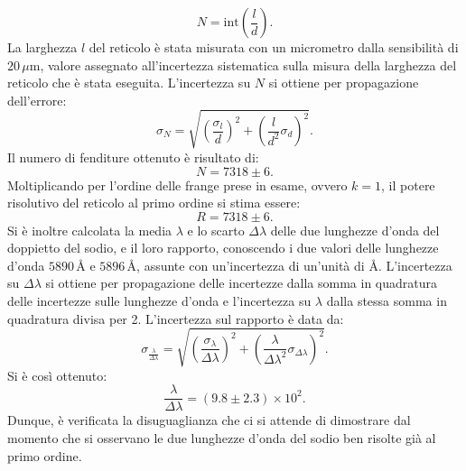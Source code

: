\documentclass[a4paper,12pt]{article}
\begin{document}
\[
N = \text{int}\left(\frac{l}{d}\right).
\]
La larghezza \( l \) del reticolo è stata misurata con un micrometro dalla sensibilità di \( 20 \, \mu\text{m} \), valore assegnato all’incertezza sistematica sulla misura della larghezza del reticolo che è stata eseguita.
L’incertezza su \( N \) si ottiene per propagazione dell’errore:
\[
\sigma_N = \sqrt{\left(\frac{\sigma_l}{d}\right)^2 + \left(\frac{l}{d^2}\sigma_d\right)^2}.
\]
Il numero di fenditure ottenuto è risultato di:
\[
N = 7318 \pm 6.
\]
Moltiplicando per l’ordine delle frange prese in esame, ovvero \( k = 1 \), il potere risolutivo del reticolo al primo ordine si stima essere:
\[
R = 7318 \pm 6.
\]
Si è inoltre calcolata la media \( \lambda \) e lo scarto \( \Delta\lambda \) delle due lunghezze d’onda del doppietto del sodio, e il loro rapporto, conoscendo i due valori delle lunghezze d’onda \( 5890 \, \text{\AA} \) e \( 5896 \, \text{\AA} \), assunte con un’incertezza di un’unità di \(\text{\AA}\).
L’incertezza su \( \Delta\lambda \) si ottiene per propagazione delle incertezze dalla somma in quadratura delle incertezze sulle lunghezze d’onda e l’incertezza su \( \lambda \) dalla stessa somma in quadratura divisa per 2.
L’incertezza sul rapporto è data da:
\[
\sigma_{\frac{\lambda}{\Delta\lambda}} = \sqrt{\left(\frac{\sigma_\lambda}{\Delta\lambda}\right)^2 + \left(\frac{\lambda}{\Delta\lambda^2}\sigma_{\Delta\lambda}\right)^2}.
\]
Si è così ottenuto:
\[
\frac{\lambda}{\Delta\lambda} = (9.8 \pm 2.3) \times 10^2.
\]
Dunque, è verificata la disuguaglianza che ci si attende di dimostrare dal momento che si osservano le due lunghezze d’onda del sodio ben risolte già al primo ordine.
\end{document}
